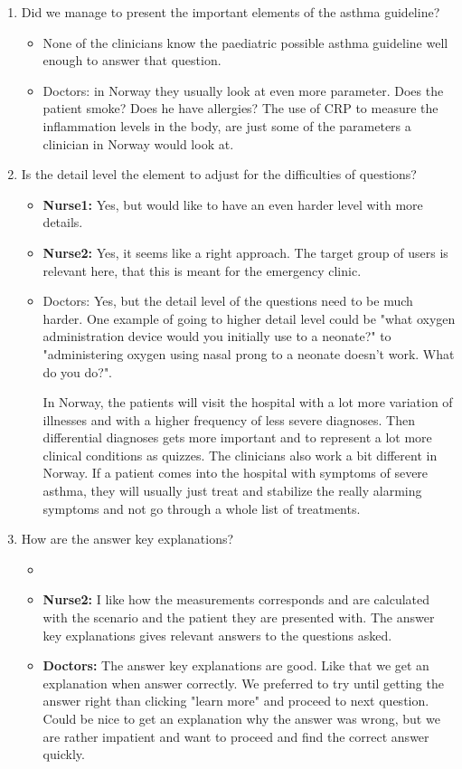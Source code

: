 \begin{enumerate}
\begin{itemize}
	\end{itemize}
	\item Did we manage to present the important elements of the asthma guideline?
	\begin{itemize}
		\item None of the clinicians know the paediatric possible asthma guideline \parencite{RepublicofKeny2016} well enough to answer that question.
		\item {Doctors:} in Norway they usually look at even more parameter. Does the patient smoke? Does he have allergies? The use of CRP to measure the inflammation levels in the body, are just some of the parameters a clinician in Norway would look at.
	\end{itemize}
	\item Is the detail level the element to adjust for the difficulties of questions?
	\begin{itemize}
		\item \textbf{Nurse1:} Yes, but would like to have an even harder level with more details.
		\item \textbf{Nurse2:} Yes, it seems like a right approach. The target group of users is relevant here, that this is meant for the emergency clinic.
		\item {Doctors:} Yes, but the detail level of the questions need to be much harder. One example of going to higher detail level could be "what oxygen administration device would you initially use to a neonate?" to "administering oxygen using nasal prong to a neonate doesn't work. What do you do?". 
		
		In Norway, the patients will visit the hospital with a lot more variation of illnesses and with a higher frequency of less severe diagnoses. Then differential diagnoses gets more important and to represent a lot more clinical conditions as quizzes. The clinicians also work a bit different in Norway. If a patient comes into the hospital with symptoms of severe asthma, they will usually just treat and stabilize the really alarming symptoms and not go through a whole list of treatments.
	\end{itemize}
	\item How are the answer key explanations?
	\begin{itemize}
		\item 
		\item \textbf{Nurse2:} I like how the measurements corresponds and are calculated with the scenario and the patient they are presented with. The answer key explanations gives relevant answers to the questions asked.
		\item \textbf{Doctors:} The answer key explanations are good. Like that we get an explanation when answer correctly. We preferred to try until getting the answer right than clicking "learn more" and proceed to next question. Could be nice to get an explanation why the answer was wrong, but we are rather impatient and want to proceed and find the correct answer quickly.
	\end{itemize}
\end{enumerate}

